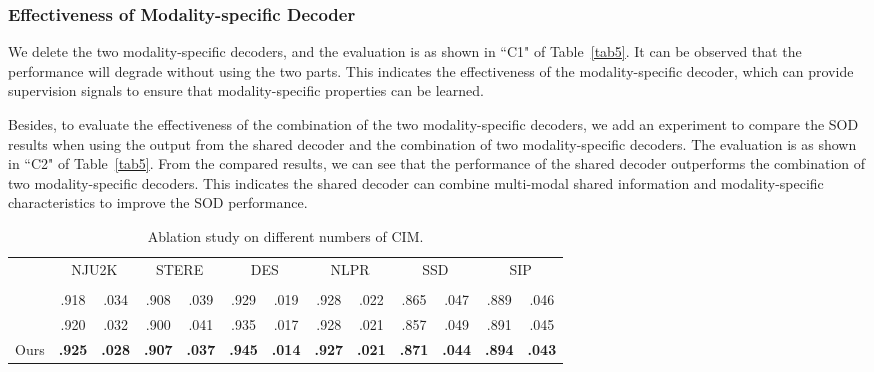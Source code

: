 \documentclass[10pt,twocolumn,letterpaper]{article}
\begin{document}
\subsubsection{Effectiveness of Modality-specific Decoder}

We delete the two modality-specific decoders, and the evaluation is as shown in ``C1" of Table~\ref{tab5}. It can be observed that the performance will degrade without using the two parts. This indicates the effectiveness of the modality-specific decoder, which can provide supervision signals to ensure that modality-specific properties can be learned.

Besides, to evaluate the effectiveness of the combination of the two modality-specific decoders, we add an experiment to compare the SOD results when using the output from the shared decoder and the combination of two modality-specific decoders. The evaluation is as shown in ``C2" of Table~\ref{tab5}. From the compared results, we can see that the performance of the shared decoder outperforms the combination of two modality-specific decoders. This indicates the shared decoder can combine multi-modal shared information and modality-specific characteristics to improve the SOD performance.

\begin{table}[t!]
  \centering
  \renewcommand{\arraystretch}{1.2}
  \renewcommand{\tabcolsep}{0.5mm}
  \caption{Ablation study on different numbers of CIM.
  } \scriptsize
  \begin{tabular}{c|cc|cc|cc|cc|cc|cc}
  \hline


    &\multicolumn{2}{c|}{NJU2K}
    &\multicolumn{2}{c|}{STERE}
    &\multicolumn{2}{c|}{DES}
    &\multicolumn{2}{c|}{NLPR}
    &\multicolumn{2}{c|}{SSD}
    &\multicolumn{2}{c}{SIP}\\


    &   &
    &    &
    &    &
    &    &
    &    &
    &    & \\


    \hline

    
    & .918   & .034
    & .908   & .039
    & .929   & .019
    & .928   & .022
    & .865   & .047
    & .889   & .046 	\\

    
    & .920   & .032
    & .900   & .041
    & .935   & .017
    & .928   & .021
    & .857   & .049
    & .891   & .045 	\\

    Ours
    & \textbf{.925}   & \textbf{.028}
    & \textbf{.907}   & \textbf{.037}
    & \textbf{.945}   & \textbf{.014}
    & \textbf{.927}   & \textbf{.021}
    & \textbf{.871}   & \textbf{.044}
    & \textbf{.894}   & \textbf{.043} 	\\

  \hline
  \end{tabular}\label{tab6}
\end{table}
\end{document}
